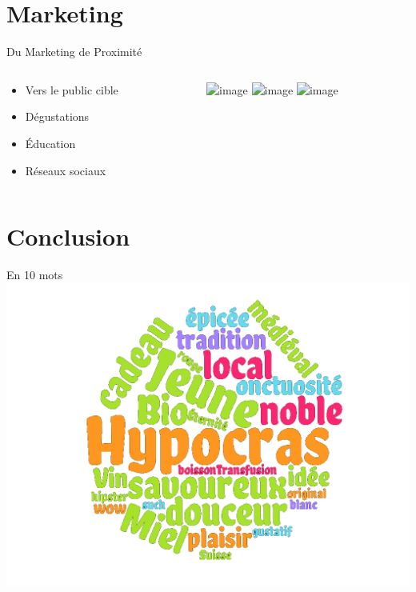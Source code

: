 \documentclass[11pt]{beamer}
\begin{document}
\section{Marketing}
\begin{frame}{Du Marketing de Proximité}
  \begin{columns}[c] %
     \begin{column}[c]{5cm} %
     \begin{itemize}[<+->]
     \item Vers le public cible
     \item Dégustations
     \item Éducation
     \item Réseaux sociaux
     \end{itemize}
     \end{column}
     \begin{column}[c]{5cm} %
          \includegraphics<1>[width=\textwidth]{img/banshees_2.jpg}
          \includegraphics<2>[width=\textwidth]{img/conv.jpg}
          \includegraphics<3->[width=\textwidth]{img/flyer.jpg}
     \end{column}
   \end{columns}
\end{frame}
\section{Conclusion}
\begin{frame}{En 10 mots}
\includegraphics[height=\textheight]{img/wordcloud_round.png}
\end{frame}
\end{document}
